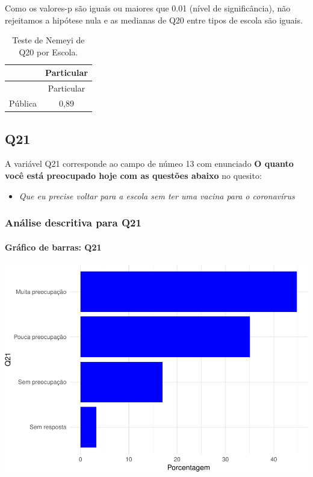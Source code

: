 \documentclass[]{article}
\providecommand{\tightlist}{%
  \setlength{\itemsep}{0pt}\setlength{\parskip}{0pt}}
\let\oldparagraph\paragraph
\renewcommand{\paragraph}[1]{\oldparagraph{#1}\mbox{}}
\begin{document}
Como os valores-p são iguais ou maiores que 0.01 (nível de significância), não rejeitamos a hipótese nula e as medianas de Q20 entre tipos de escola são iguais.

\begin{longtable}[]{@{}lc@{}}
\caption{\label{tab:unnamed-chunk-415}Teste de Nemeyi de Q20 por Escola.}\tabularnewline
\toprule
& Particular\tabularnewline
\midrule
\endfirsthead
\toprule
& Particular\tabularnewline
\midrule
\endhead
Pública & 0,89\tabularnewline
\bottomrule
\end{longtable}

\cleardoublepage

\hypertarget{q21}{%
\subsection{Q21}\label{q21}}

A variável Q21 corresponde ao campo de númeo 13 com enunciado \textbf{O quanto você está preocupado hoje com as questões abaixo} no quesito:

\begin{itemize}
\tightlist
\item
  \emph{Que eu precise voltar para a escola sem ter uma vacina para o coronavírus}
\end{itemize}

\hypertarget{anuxe1lise-descritiva-para-q21}{%
\subsubsection{Análise descritiva para Q21}\label{anuxe1lise-descritiva-para-q21}}

\hypertarget{gruxe1fico-de-barras-q21}{%
\paragraph{Gráfico de barras: Q21}\label{gruxe1fico-de-barras-q21}}

\begin{center}\includegraphics[width=0.75\linewidth]{relatorio_covid19_files/figure-latex/unnamed-chunk-422-1} \end{center}
\end{document}
